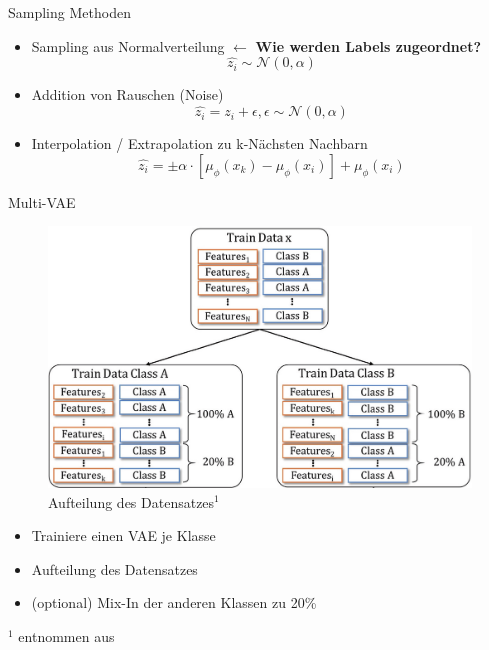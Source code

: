 \documentclass[10pt, compress]{beamer}
\begin{document}
\begin{frame}{Sampling Methoden}
\begin{itemize}
  \item Sampling aus Normalverteilung \hfill {\color{red}$\leftarrow$ \textbf{Wie werden Labels zugeordnet?}}
    \begin{equation*}
      \hat{z_i} \sim \mathcal{N}(0, \alpha)
    \end{equation*}
  \item Addition von Rauschen (Noise)
    \begin{equation*}
      \hat{z_i} = z_i + \epsilon, \epsilon \sim \mathcal{N}(0, \alpha)
    \end{equation*}
  \item Interpolation / Extrapolation zu k-Nächsten Nachbarn
    \begin{equation*}
      \hat{z_i} = \pm \alpha \cdot \left[\mu_\phi(x_k) - \mu_\phi(x_i)\right] + \mu_\phi(x_i)
    \end{equation*}
\end{itemize}
\end{frame}

\begin{frame}{Multi-VAE}
  \begin{minipage}[c]{.49\textwidth}
    \begin{figure}[hbt]
      \includegraphics[width=\textwidth]{gfx/methodology/ds_split}
      \caption{Aufteilung des Datensatzes$^1$}
    \end{figure}
  \end{minipage}
  \begin{minipage}[c]{.5\textwidth}
    \begin{itemize}
      \item Trainiere einen VAE je Klasse
      \item Aufteilung des Datensatzes
      \item (optional) Mix-In der anderen Klassen zu 20\%
    \end{itemize}
  \end{minipage}
  \vfill
  {\tiny $^1$ entnommen aus \cite{Moreno-Barea2020}}
\end{frame}
\end{document}

